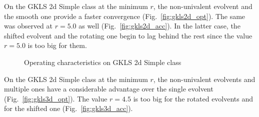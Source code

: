 \documentclass[procedia]{easychair}
\begin{document}
On the GKLS 2d Simple class at the minimum \(r\), the non-univalent evolvent and the smooth
one provide a faster convergence (Fig.~\ref{fig:gkls2d_opt}). The same was observed at
\(r=5.0\) as well (Fig.~\ref{fig:gkls2d_acc}). In the latter case, the shifted evolvent and the
rotating one begin to lag behind the rest since the value \(r=5.0\) is too big for them.
\begin{figure}[ht]
    \centering

    \caption{Operating characteristics on GKLS 2d Simple class}
\end{figure}

On the GKLS 2d Simple class at the minimum \(r\), the non-univalent evolvents and multiple
ones have a considerable advantage over the single evolvent (Fig.~\ref{fig:gkls3d_opt}).
The value \(r=4.5\) is too big for the rotated evolvents and for the shifted one
(Fig.~\ref{fig:gkls3d_acc}).
\end{document}

